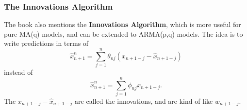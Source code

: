 \documentclass[%
xcolor=pdftex]{beamer}
\begin{document}
\begin{frame}
\frametitle{The Innovations Algorithm}

The book also mentions the {\bf Innovations Algorithm}, which is more useful for pure MA(q) models, and can be extended to ARMA(p,q) models. The idea is to write predictions in terms of 
$$
\hat{x}_{n+1}^n = \sum_{j=1}^n \theta_{nj} ( x_{n+1-j} - \hat{x}_{n+1-j})
$$
instead of 
$$
\hat{x}_{n+1}^n = \sum_{j=1}^n \phi_{nj} x_{n+1-j}.
$$
The $x_{n+1-j} - \hat{x}_{n+1-j}$ are called the innovations, and are kind of like $w_{n+1-j}$.
\end{frame}
\end{document}
